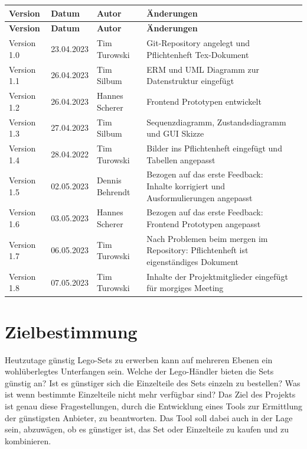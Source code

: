 \begin{flushleft}
		\begin{longtable}{p{2cm}p{2cm}p{3cm}p{9cm}c}
            \toprule
            \textbf{Version} & \textbf{Datum} & \textbf{Autor} & \textbf{Änderungen}\\
            \midrule\endfirsthead
            \toprule
            \textbf{Version} & \textbf{Datum} & \textbf{Autor} & \textbf{Änderungen}\\
            \midrule\endhead
            	Version 1.0 & 23.04.2023 & Tim Turowski & Git-Repository angelegt und Pflichtenheft Tex-Dokument \\ \midrule
				Version 1.1 & 26.04.2023 & Tim Silbum & ERM und UML Diagramm zur Datenstruktur eingefügt \\ \midrule
				Version 1.2 & 26.04.2023 & Hannes Scherer & Frontend Prototypen entwickelt \\ \midrule
				Version 1.3 & 27.04.2023 & Tim Silbum & Sequenzdiagramm, Zustandsdiagramm und GUI Skizze \\ \midrule
 				Version 1.4 & 28.04.2022 & Tim Turowski & Bilder ins Pflichtenheft eingefügt und Tabellen angepasst \\ \midrule
				Version 1.5 & 02.05.2023 & Dennis Behrendt & Bezogen auf das erste Feedback: Inhalte korrigiert und Ausformulierungen angepasst \\ \midrule
				Version 1.6 & 03.05.2023 & Hannes Scherer & Bezogen auf das erste Feedback: Frontend Prototypen angepasst \\ \midrule
				Version 1.7 & 06.05.2023 & Tim Turowski & Nach Problemen beim mergen im Repository: Pflichtenheft ist eigenständiges Dokument \\ \midrule
				Version 1.8 & 07.05.2023 & Tim Turowski & Inhalte der Projektmitglieder eingefügt für morgiges Meeting \\ 
            \bottomrule
    \end{longtable}

\end{flushleft}

\newpage

\tableofcontents

\newpage

\section{Zielbestimmung}

Heutzutage günstig Lego-Sets zu erwerben kann auf mehreren Ebenen ein wohlüberlegtes Unterfangen sein. Welche der Lego-Händler bieten die Sets günstig an? Ist es günstiger sich die Einzelteile des Sets einzeln zu bestellen? Was ist wenn bestimmte Einzelteile nicht mehr verfügbar sind? \newline
Das Ziel des Projekts ist genau diese Fragestellungen, durch die Entwicklung eines Tools zur Ermittlung der günstigsten Anbieter, zu beantworten. Das Tool soll dabei auch in der Lage sein, abzuwägen, ob es günstiger ist, das Set oder Einzelteile zu kaufen und zu kombinieren.

